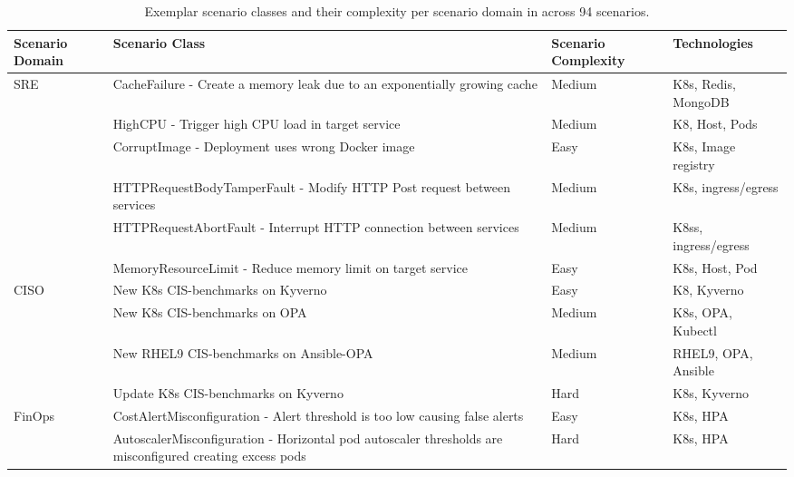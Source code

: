 \begin{table*}[h]
    \centering
    \footnotesize
    \begin{threeparttable}
        \caption{Exemplar scenario classes and their complexity per scenario domain in \bench across 94 scenarios.}
        \label{tab:bench_scenarios}
        \begin{tabular}{m{}m{}m{}m{}}
            \toprule
            \textbf{Scenario Domain} & \textbf{Scenario Class} & \textbf{Scenario \mbox{Complexity}} & \textbf{Technologies} \\
            \midrule
             SRE & CacheFailure - Create a memory leak due to an exponentially growing cache            & Medium              & K8s, Redis, MongoDB \\
            & HighCPU - Trigger high CPU load in target service          & Medium                 & K8, Host, Pods \\
            & CorruptImage - Deployment uses wrong Docker image & Easy              & K8s, Image registry\\
            & HTTPRequestBodyTamperFault - Modify HTTP Post request between services     & Medium                & K8s, ingress/egress  \\
            & HTTPRequestAbortFault - Interrupt HTTP connection between services     & Medium                & K8ss, ingress/egress  \\
            & MemoryResourceLimit - Reduce memory limit on target service    & Easy                & K8s, Host, Pod  \\\midrule
            CISO & New K8s CIS-benchmarks on Kyverno & Easy            & K8, Kyverno  \\
            & New K8s CIS-benchmarks on OPA           & Medium            & K8s, OPA, Kubectl  \\
            & New RHEL9 CIS-benchmarks on Ansible-OPA         & Medium            & RHEL9, OPA, Ansible \\
            & Update K8s CIS-benchmarks on Kyverno               & Hard              & K8s, Kyverno   \\ \midrule
            FinOps & CostAlertMisconfiguration - Alert threshold is too low causing false alerts         &          Easy     & K8s, HPA  \\
            & AutoscalerMisconfiguration - Horizontal pod autoscaler thresholds are misconfigured creating excess pods           &    Hard          & K8s, HPA \\

\end{tabular}
\end{threeparttable}
\end{table*}
